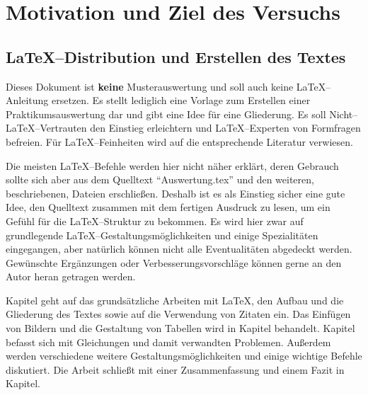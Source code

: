
\chapter{Motivation und Ziel des Versuchs}
\label{chap:einleitung}
%
\section{\LaTeX --Distribution und Erstellen des Textes}


Dieses Dokument ist \textbf{keine} Musterauswertung und soll auch keine \LaTeX --Anleitung ersetzen. 
Es stellt lediglich eine Vorlage zum Erstellen einer Praktikumsauswertung dar und gibt eine Idee für 
eine Gliederung. Es soll Nicht--\LaTeX --Vertrauten den Einstieg erleichtern und \LaTeX --Experten von 
Formfragen befreien. Für \LaTeX --Feinheiten wird auf die entsprechende Literatur verwiesen.

Die meisten \LaTeX --Befehle werden hier nicht näher erklärt, deren Gebrauch sollte sich aber aus dem 
Quelltext ``Auswertung.tex'' und den weiteren, beschriebenen, Dateien
erschließen. Deshalb ist es als Einstieg sicher eine gute Idee, den Quelltext zusammen mit dem fertigen 
Ausdruck zu lesen, um ein Gefühl für die \LaTeX --Struktur zu bekommen. Es wird hier zwar auf grundlegende 
\LaTeX --Gestaltungsmöglichkeiten und einige Spezialitäten eingegangen, aber natürlich können nicht alle 
Eventualitäten abgedeckt werden. Gewünschte Ergänzungen oder Verbesserungsvorschläge können gerne an den 
Autor heran getragen werden.

Kapitel geht auf das grundsätzliche Arbeiten mit \LaTeX , den Aufbau und die
Gliederung des Textes sowie auf die Verwendung von Zitaten ein. Das Einfügen von Bildern und die 
Gestaltung von Tabellen wird in Kapitel behandelt. Kapitel
befasst sich mit Gleichungen und damit verwandten Problemen. Au\ss erdem werden 
verschiedene weitere Gestaltungsmöglichkeiten und einige wichtige Befehle diskutiert. Die Arbeit 
schließt mit einer Zusammenfassung und einem Fazit in Kapitel.
